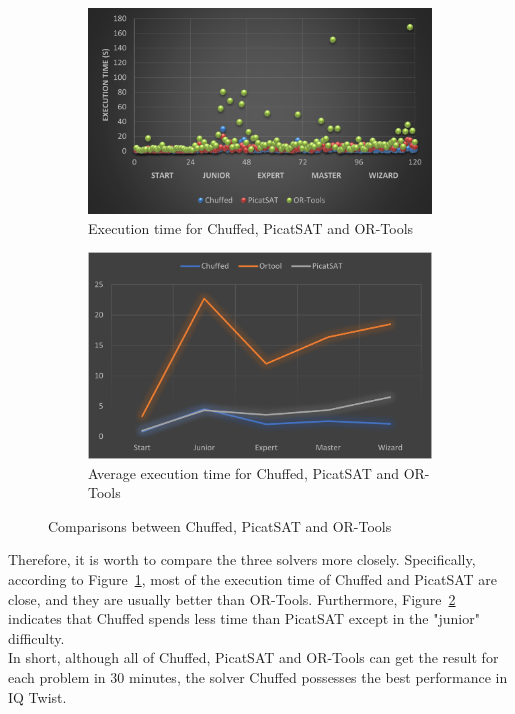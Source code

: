 \begin{figure}[H]
\centering
\begin{subfigure}[b]{.48\textwidth}
\centering
\includegraphics[width=\textwidth]{figs/threesolverpoints.png}
\caption{Execution time for Chuffed, PicatSAT and OR-Tools}
\label{fig:3solvers1}
\end{subfigure}
\begin{subfigure}[b]{.48\textwidth}
\centering
\includegraphics[width=\textwidth]{figs/Three comparison.png}
\caption{Average execution time for Chuffed, PicatSAT and OR-Tools}
\label{fig:3comparison}
\end{subfigure}
\caption{Comparisons between Chuffed, PicatSAT and OR-Tools}
\label{fig:3comparisonsssss}
\end{figure}
Therefore, it is worth to compare the three solvers more closely. Specifically, according to Figure~\ref{fig:3solvers1}, most of the execution time of Chuffed and PicatSAT are close, and they are usually better than OR-Tools.
Furthermore, Figure~\ref{fig:3comparison} indicates that Chuffed spends less time than PicatSAT except in the "junior" difficulty.
\\In short, although all of Chuffed, PicatSAT and OR-Tools can get the result for each problem in 30 minutes, the solver Chuffed possesses the best performance in IQ Twist.
